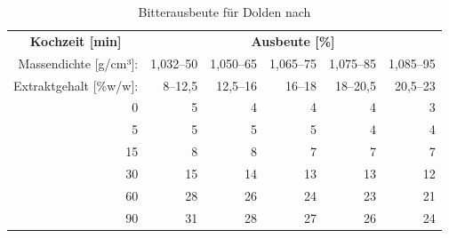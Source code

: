 \documentclass[a4paper,parskip=half]{scrartcl}
\begin{document}
\begin{table}[H]
\centering
\begin{tabular}{rrrrrr} 
\toprule
\multicolumn{1}{c}{\textbf{Kochzeit [min]}} & \multicolumn{5}{c}{\textbf{Ausbeute [\%]}}                                 \\
Massendichte [g/cm³]:                    & 1,032–50 & 1,050–65 & 1,065–75 & 1,075–85 & 1,085–95  \\
Extraktgehalt [\%w/w]:                    & 8–12,5 & 12,5–16 & 16–18 & 18–20,5 & 20,5–23  \\
\midrule                                             
0                                            & 5        & 4        & 4                            & 4                            & 3                             \\
5                                            & 5        & 5        & 5                            & 4                            & 4                             \\
15                                           & 8        & 8        & 7                            & 7                            & 7                             \\
30                                           & 15       & 14       & 13                           & 13                           & 12                            \\
60                                           & 28       & 26       & 24                           & 23                           & 21                            \\
90                                           & 31       & 28       & 27                           & 26                           & 24                            \\
\bottomrule
\end{tabular}
\caption{Bitterausbeute für Dolden nach \citeauthor{Noonan1996} \parencite[215]{Noonan1996}}
\label{table:noonanutil}
\end{table}
\end{document}

